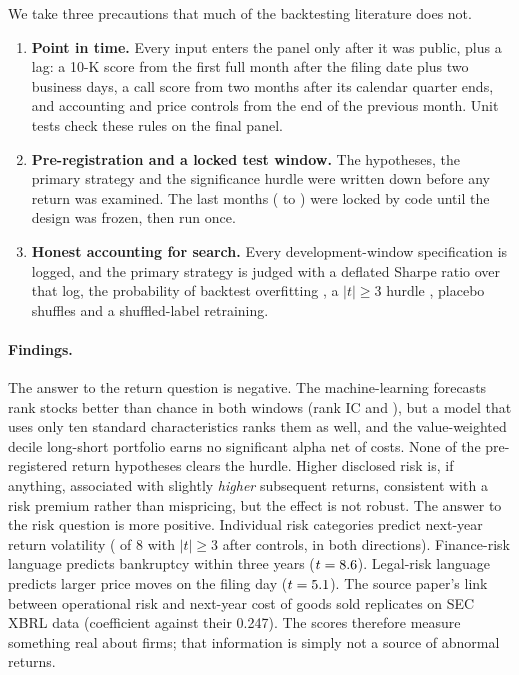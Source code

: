 \documentclass[11pt,a4paper]{article}
\begin{document}
We take three precautions that much of the backtesting literature does not.
\begin{enumerate}
  \item \textbf{Point in time.} Every input enters the panel only after it was public, plus a lag: a 10-K score from the
  first full month after the filing date plus two business days, a call score from two months after its calendar quarter
  ends, and accounting and price controls from the end of the previous month. Unit tests check these rules on the final panel.
  \item \textbf{Pre-registration and a locked test window.} The hypotheses, the primary strategy and the significance
  hurdle were written down before any return was examined. The last \TestMonths{} months (\TestStart{} to \TestEnd) were locked by
  code until the design was frozen, then run once.
  \item \textbf{Honest accounting for search.} Every development-window specification is logged, and the primary
  strategy is judged with a deflated Sharpe ratio \citep{bailey2014} over that log, the probability of backtest
  overfitting \citep{bailey2017}, a $|t|\geq 3$ hurdle \citep{hlz2016}, placebo shuffles and a shuffled-label retraining.
\end{enumerate}

\paragraph{Findings.} The answer to the return question is negative. The machine-learning forecasts rank stocks better
than chance in both windows (rank IC \DevIC{} and \TestIC), but a model that uses only ten standard characteristics ranks
them as well, and the value-weighted decile long-short portfolio earns no significant alpha net of costs. None of the
pre-registered return hypotheses clears the hurdle. Higher disclosed risk is, if anything, associated with slightly
\emph{higher} subsequent returns, consistent with a risk premium rather than mispricing, but the effect is not robust.
The answer to the risk question is more positive. Individual risk categories predict next-year return volatility
(\VolSigCount{} of 8 with $|t|\geq3$ after controls, in both directions). Finance-risk language predicts bankruptcy within
three years ($t=8.6$). Legal-risk language predicts larger price moves on the filing day ($t=5.1$).
The source paper's link between operational risk and next-year cost of goods sold replicates on SEC XBRL data
(coefficient \RepOpFour{} against their 0.247). The scores therefore measure something real about firms; that
information is simply not a source of abnormal returns.
\end{document}
